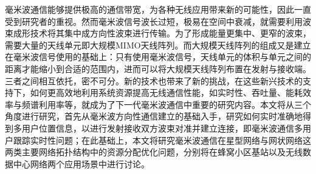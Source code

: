 毫米波通信能够提供极高的通信带宽，为各种无线应用带来新的可能性，因此一直受到研究者的重视。然而毫米波信号波长过短，极易在空间中衰减，就需要利用波束成形技术将其集中成方向性波束进行传输。为了形成能量更集中、更窄的波束，需要大量的天线单元即大规模MIMO天线阵列。而大规模天线阵列的组成又是建立在毫米波信号使用的基础上：只有使用毫米波信号，天线单元的体积与单元之间的距离才能缩小到合适的范围内，进而可以将大规模天线阵列布置在发射与接收端。三者之间相互依托，密不可分。新的技术也带来了新的挑战，在这些新兴技术的支持下，如何更高效地利用系统资源提高无线通信性能，如实时性、吞吐量、能耗效率与频谱利用率等，就成为了下一代毫米波通信中重要的研究内容。本文将从三个角度进行研究，首先从毫米波方向性通信建立的基础入手，研究如何实时准确地得到多用户位置信息，以进行发射接收双方波束对准并建立连接，即毫米波通信多用户跟踪实时性问题；在此基础上，本文将研究毫米波通信在星型网络与网状网络这两类主要网络拓扑结构中的资源分配优化问题，分别将在蜂窝小区基站以及无线数据中心网络两个应用场景中进行讨论。

